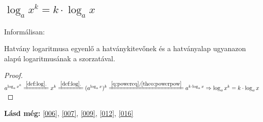 \subsection{
\texorpdfstring
  {$\log_{a}x^k = k \cdot \log_{a}x$}
  {log\textunderscore{}a(x**k) = k * log\textunderscore{}a(x)}
}

Informálisan:

Hatvány logaritmusa egyenlő a hatványkitevőnek és a hatványalap ugyanazon alapú
logaritmusának a szorzatával.

\begin{proof}
$
  a^{\log_{a}x^k}
    \xlongequal{\ref{def:log}.}
  x^k
    \xlongequal{\ref{def:log}.}
  (a^{\log_{a}x})^k
    \xlongequal{\ref{q:powereq}/\ref{theo:powerpow}}
  a^{k \cdot \log_{a}x}
    \Rightarrow
  \log_{a}x^k = k \cdot \log_{a}x
$
\end{proof}	

\textbf{Lásd még:} \ref{006}, \ref{007}, \ref{009}, \ref{012}, \ref{016}
